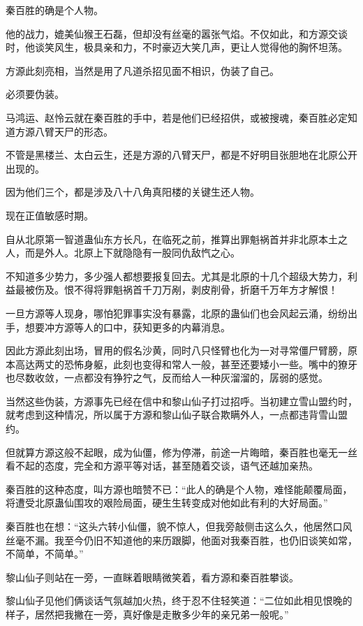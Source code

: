 
\begin{this_body}

秦百胜的确是个人物。

他的战力，媲美仙猴王石磊，但却没有丝毫的嚣张气焰。不仅如此，和方源交谈时，他谈笑风生，极具亲和力，不时豪迈大笑几声，更让人觉得他的胸怀坦荡。

方源此刻亮相，当然是用了凡道杀招见面不相识，伪装了自己。

必须要伪装。

马鸿运、赵怜云就在秦百胜的手中，若是他们已经招供，或被搜魂，秦百胜必定知道方源八臂天尸的形态。

不管是黑楼兰、太白云生，还是方源的八臂天尸，都是不好明目张胆地在北原公开出现的。

因为他们三个，都是涉及八十八角真阳楼的关键生还人物。

现在正值敏感时期。

自从北原第一智道蛊仙东方长凡，在临死之前，推算出罪魁祸首并非北原本土之人，而是外人。北原上下就隐隐有一股同仇敌忾之心。

不知道多少势力，多少强人都想要报复回去。尤其是北原的十几个超级大势力，利益最被伤及。恨不得将罪魁祸首千刀万剐，剥皮削骨，折磨千万年方才解恨！

一旦方源等人现身，哪怕犯罪事实没有暴露，北原的蛊仙们也会风起云涌，纷纷出手，想要冲方源等人的口中，获知更多的内幕消息。

因此方源此刻出场，冒用的假名沙黄，同时八只怪臂也化为一对寻常僵尸臂膀，原本高达两丈的恐怖身躯，此刻也变得和常人一般，甚至还要矮小一些。嘴中的獠牙也尽数收敛，一点都没有狰狞之气，反而给人一种灰溜溜的，孱弱的感觉。

当然这些伪装，方源事先已经在信中和黎山仙子打过招呼。当初建立雪山盟约时，就考虑到这种情况，所以属于方源和黎山仙子联合欺瞒外人，一点都违背雪山盟约。

但就算方源这般不起眼，成为仙僵，修为停滞，前途一片晦暗，秦百胜也毫无一丝看不起的态度，完全和方源平等对话，甚至随着交谈，语气还越加亲热。

秦百胜的这种态度，叫方源也暗赞不已：“此人的确是个人物，难怪能颠覆局面，将遭受北原蛊仙围攻的艰险局面，硬生生转变成对他如此有利的大好局面。”

秦百胜也在想：“这头六转小仙僵，貌不惊人，但我旁敲侧击这么久，他居然口风丝毫不漏。我至今仍旧不知道他的来历跟脚，他面对我秦百胜，也仍旧谈笑如常，不简单，不简单。”

黎山仙子则站在一旁，一直眯着眼睛微笑着，看方源和秦百胜攀谈。

黎山仙子见他们俩谈话气氛越加火热，终于忍不住轻笑道：“二位如此相见恨晚的样子，居然把我撇在一旁，真好像是走散多少年的亲兄弟一般呢。”


\end{this_body}
